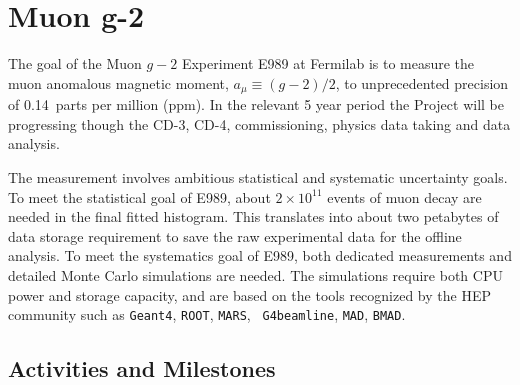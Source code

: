 \documentclass[pdftex,12pt,letter]{article}
\begin{document}
\pagebreak
\section{Muon g-2}

The goal of the Muon $g-2$ Experiment E989 at Fermilab is to measure
the muon anomalous magnetic moment, $a_\mu \equiv (g-2)/2$, to
unprecedented precision of 0.14~parts per million (ppm).
In the relevant 5 year period the Project will be progressing though
the CD-3, CD-4, commissioning, physics data taking and data analysis.  

The measurement involves ambitious statistical and systematic
uncertainty goals. 
To meet the statistical goal of E989, about $2\times 10^{11}$ events
of muon decay are needed in the final fitted histogram. 
This translates into about two petabytes of data storage requirement
to save the raw experimental data for the offline analysis. 
To meet the systematics goal of E989, both dedicated measurements and
detailed Monte Carlo simulations are needed. 
The simulations require both CPU power and storage capacity,
and are based on the tools recognized by
the HEP community such as {\tt Geant4}, {\tt ROOT}, {\tt MARS}, {\tt
  G4beamline}, {\tt MAD}, {\tt BMAD}. 

\subsection{Activities and Milestones}
\end{document}
